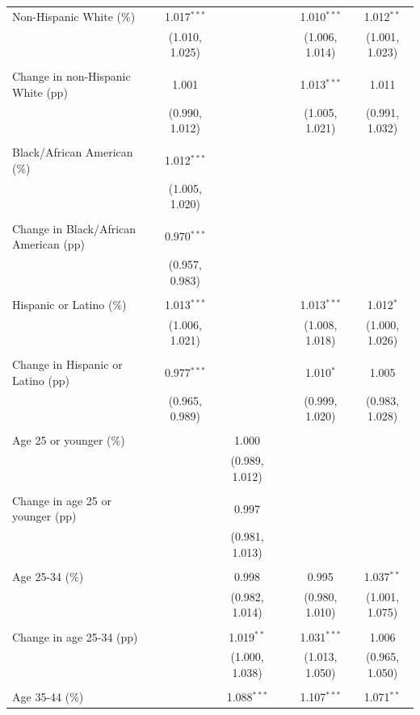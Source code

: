 \documentclass[]{article}
\begin{document}
\begin{landscape}
\begin{longtable}[c]{@{}lccccc@{}}
 Non-Hispanic White (\%) & 1.017$^{***}$ &  &  & 1.010$^{***}$ & 1.012$^{**}$ \\ 
  & (1.010, 1.025) &  &  & (1.006, 1.014) & (1.001, 1.023) \\ 
  & & & & & \\ 
 Change in non-Hispanic White (pp) & 1.001 &  &  & 1.013$^{***}$ & 1.011 \\ 
  & (0.990, 1.012) &  &  & (1.005, 1.021) & (0.991, 1.032) \\ 
  & & & & & \\ 
 Black/African American (\%) & 1.012$^{***}$ &  &  &  &  \\ 
  & (1.005, 1.020) &  &  &  &  \\ 
  & & & & & \\ 
 Change in Black/African American (pp) & 0.970$^{***}$ &  &  &  &  \\ 
  & (0.957, 0.983) &  &  &  &  \\ 
  & & & & & \\ 
 Hispanic or Latino (\%) & 1.013$^{***}$ &  &  & 1.013$^{***}$ & 1.012$^{*}$ \\ 
  & (1.006, 1.021) &  &  & (1.008, 1.018) & (1.000, 1.026) \\ 
  & & & & & \\ 
 Change in Hispanic or Latino (pp) & 0.977$^{***}$ &  &  & 1.010$^{*}$ & 1.005 \\ 
  & (0.965, 0.989) &  &  & (0.999, 1.020) & (0.983, 1.028) \\ 
  & & & & & \\ 
 Age 25 or younger (\%) &  & 1.000 &  &  &  \\ 
  &  & (0.989, 1.012) &  &  &  \\ 
  & & & & & \\ 
 Change in age 25 or younger (pp) &  & 0.997 &  &  &  \\ 
  &  & (0.981, 1.013) &  &  &  \\ 
  & & & & & \\ 
 Age 25-34 (\%) &  & 0.998 &  & 0.995 & 1.037$^{**}$ \\ 
  &  & (0.982, 1.014) &  & (0.980, 1.010) & (1.001, 1.075) \\ 
  & & & & & \\ 
 Change in age 25-34 (pp) &  & 1.019$^{**}$ &  & 1.031$^{***}$ & 1.006 \\ 
  &  & (1.000, 1.038) &  & (1.013, 1.050) & (0.965, 1.050) \\ 
  & & & & & \\ 
 Age 35-44 (\%) &  & 1.088$^{***}$ &  & 1.107$^{***}$ & 1.071$^{**}$ \\ 

\end{longtable}
\end{landscape}
\end{document}
